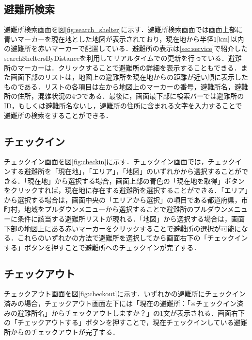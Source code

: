 \documentclass[technicalreport,dvipdfmx]{ieicej}
\begin{document}
\subsection{避難所検索}
避難所検索画面を図\ref{fig:search_shelter}に示す．避難所検索画面では画面上部に青いマーカーを現在地とした地図が表示されており，現在地から半径1$\rm[km]$以内の避難所を赤いマーカーで配置している．避難所の表示は\ref{sec:service}で紹介したsearchSheltersByDistanceを利用してリアルタイムでの更新を行っている．避難所のマーカーは．クリックすることで避難所の詳細を表示することもできる．また画面下部のリストは，地図上の避難所を現在地からの距離が近い順に表示したものである．リストの各項目は左から地図上のマーカーの番号，避難所名，避難所の住所，混雑状況の4つである．最後に，画面最下部に検索バーでは避難所のID，もしくは避難所名ないし，避難所の住所に含まれる文字を入力することで避難所の検索をすることができる．

\subsection{チェックイン}
チェックイン画面を図\ref{fig:checkin}に示す．チェックイン画面では，チェックインする避難所を「現在地」，「エリア」，「地図」のいずれかから選択することができる．「現在地」から選択する場合，画面上部の青色の「現在地を取得」ボタンをクリックすれば，現在地に存在する避難所を選択することができる．「エリア」から選択する場合は，画面中央の「エリアから選択」の項目である都道府県，市町村，地域をプルダウンメニューから選択することで避難所のプルダウンメニューに条件に該当する避難所リストが現れる．「地図」から選択する場合は，画面下部の地図上にある赤いマーカーをクリックすることで避難所の選択が可能になる．これらのいずれかの方法で避難所を選択してから画面右下の「チェックインする」ボタンを押すことで避難所へのチェックインが完了する．

\subsection{チェックアウト}
チェックアウト画面を図\ref{fig:checkout}に示す．いずれかの避難所にチェックイン済みの場合，チェックアウト画面左下には「現在の避難所：「※チェックイン済みの避難所名」からチェックアウトしますか？」の1文が表示される．画面右下の「チェックアウトする」ボタンを押すことで，現在チェックインしている避難所からのチェックアウトが完了する．
\end{document}
